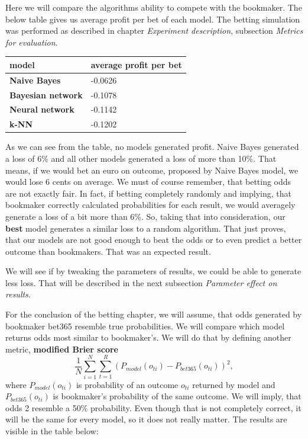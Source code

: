 \documentclass[conference]{IEEEtran}
\begin{document}
Here we will compare the algorithms ability to compete with the bookmaker. The below table gives us 
average profit per bet of each model. The betting simulation was performed as described in 
chapter \textit{Experiment description}, subsection \textit{Metrics for evaluation}.

\begin{table}[!ht]
    \centering
    \begin{tabular}{|l|l|}
    \hline
        \textbf{model} & average profit per bet \\ \hline
        \textbf{Naive Bayes} & -0.0626 \\ \hline
        \textbf{Bayesian network} & -0.1078 \\ \hline
        \textbf{Neural network} & -0.1142 \\ \hline
        \textbf{k-NN} & -0.1202 \\ \hline
    \end{tabular}
\end{table}

As we can see from the table, no models generated profit. Naive Bayes generated a loss of 6\% and 
all other models generated a loss of more than 10\%. That means, if we would bet an euro on outcome,
proposed by Naive Bayes model, we would lose 6 cents on average. We must of course remember, 
that betting odds are not exactly fair. In fact, if betting completely 
randomly and implying, that bookmaker correctly calculated probabilities for each result, we would
averagely generate a loss of a bit more than 6\%. So, taking that into consideration, our \textbf{best}
model generates a similar loss to a random algorithm. That just proves, that our models are not good 
enough to beat the odds or to even predict a better outcome than bookmakers. That was an expected 
result.

We will see if by tweaking the parameters of results, we could be able to generate less loss. That will be described in the next subsection \textit{Parameter effect on results}.

For the conclusion of the betting chapter, we will assume, that odds generated by bookmaker bet365
resemble true probabilities. We will compare which model returns odds most similar to bookmaker's.
We will do that by defining another metric, \textbf{modified Brier score}
$$\frac{1}{N} \sum_{i=1}^{N} \sum_{t=1}^{R} {(P_{model}(o_{ti}) - P_{bet365}(o_{ti}))^2},$$
where $P_{model}(o_{ti})$ is probability of an outcome $o_{ti}$ returned by model and $P_{bet365}
(o_{ti})$ is bookmaker's probability of the same outcome. We will imply, that odds 2 resemble a 50\% 
probability. Even though that is not completely correct, it will be the same for every model, so it does
not really matter. The results are visible in the table below:
\end{document}
